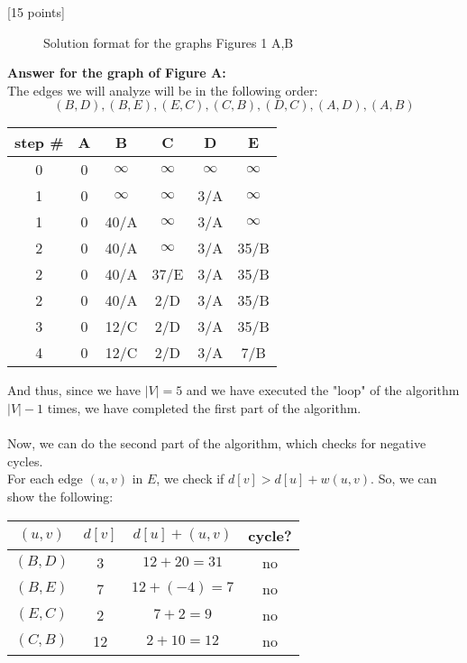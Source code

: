 \documentclass[12pt]{article}
\newcounter{ques}
\newenvironment{question}{\stepcounter{ques}{\noindent\bf Question \arabic{ques}:}}{\vspace{5mm}}
\begin{document}
\begin{question}[15 points]
\begin{figure}
	\centerline{}
	\caption{Solution format for the graphs Figures 1  A,B}
	\label{fig:Bellman-FordTable}
\end{figure}
\textbf{Answer for the graph of Figure A:}\\
The edges we will analyze will be in the following order:
$$(B, D), (B, E), (E, C), (C, B), (D, C), (A, D), (A, B)$$
\begin{center}
  \begin{tabular}{||c | c c c c c||}
   \hline
    step \# & A & B & C & D & E \\ [0.5ex]
   \hline\hline
   0 & 0 & $\infty$ & $\infty$ & $\infty$ & $\infty$\\
   \hline
   1 & 0 & $\infty$ & $\infty$ & 3/A & $\infty$\\
   1 & 0 & 40/A & $\infty$ & 3/A & $\infty$\\
   \hline
   2 & 0 & 40/A & $\infty$ & 3/A & 35/B\\
   2 & 0 & 40/A & 37/E & 3/A & 35/B\\
   2 & 0 & 40/A & 2/D & 3/A & 35/B\\
   \hline
   3 & 0 & 12/C & 2/D & 3/A & 35/B\\
   \hline
   4 & 0 & 12/C & 2/D & 3/A & 7/B\\
   \hline
  \end{tabular}
\end{center}
And thus, since we have $|V|=5$ and we have executed the "loop" of the algorithm $|V|-1$ times, we have completed the first part of the algorithm.\\\\
Now, we can do the second part of the algorithm, which checks for negative cycles.\\
For each edge $(u,v)$ in $E$, we check if $d[v] > d[u] + w(u,v)$. So, we can show the following:
\begin{center}
  \begin{tabular}{||c|c|c|c||}
   \hline
    $(u,v)$ & $d[v]$ & $d[u] + (u,v)$ & cycle?\\ [0.5ex]
   \hline\hline
   $(B,D)$ & 3 & $12+20=31$ & no\\
   \hline
   $(B,E)$ & 7 & $12+(-4)=7$ & no\\
   \hline
   $(E,C)$ & 2 & $7+2=9$ & no\\
   \hline
   $(C,B)$ & 12 & $2+10=12$ & no\\

\end{tabular}
\end{center}
\end{question}
\end{document}
